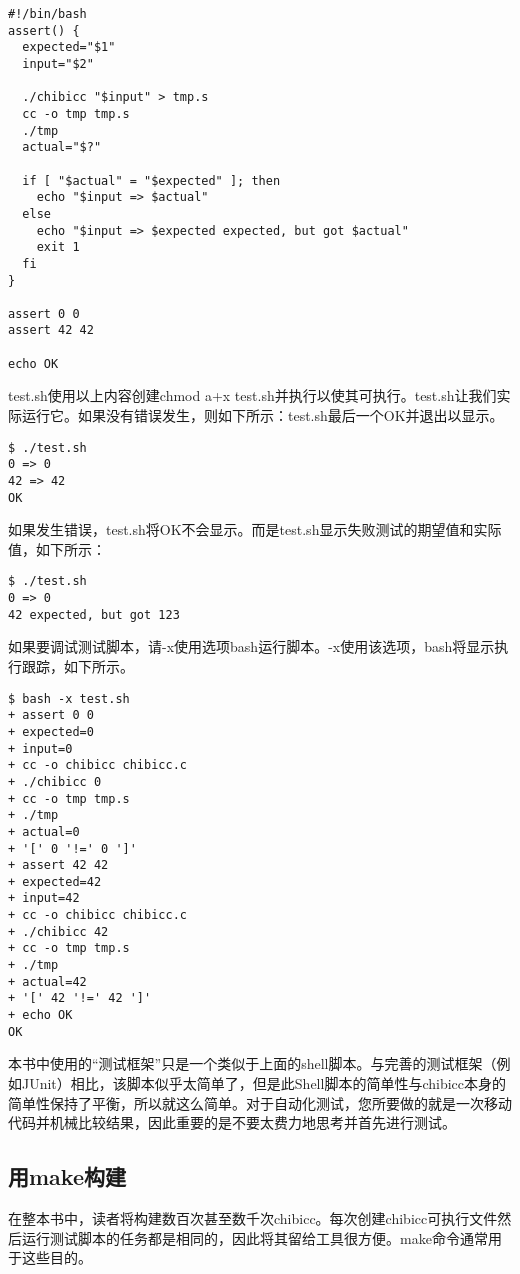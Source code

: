 \documentclass[cn,10pt,math=newtx,citestyle=gb7714-2015,bibstyle=gb7714-2015]{elegantbook}
\begin{document}
\begin{verbatim}
#!/bin/bash
assert() {
  expected="$1"
  input="$2"

  ./chibicc "$input" > tmp.s
  cc -o tmp tmp.s
  ./tmp
  actual="$?"

  if [ "$actual" = "$expected" ]; then
    echo "$input => $actual"
  else
    echo "$input => $expected expected, but got $actual"
    exit 1
  fi
}

assert 0 0
assert 42 42

echo OK
\end{verbatim}

test.sh使用以上内容创建chmod a+x test.sh并执行以使其可执行。test.sh让我们实际运行它。如果没有错误发生，则如下所示：test.sh最后一个OK并退出以显示。

\begin{verbatim}
$ ./test.sh
0 => 0
42 => 42
OK
\end{verbatim}

如果发生错误，test.sh将OK不会显示。而是test.sh显示失败测试的期望值和实际值，如下所示：

\begin{verbatim}
$ ./test.sh
0 => 0
42 expected, but got 123
\end{verbatim}

如果要调试测试脚本，请-x使用选项bash运行脚本。-x使用该选项，bash将显示执行跟踪，如下所示。

\begin{verbatim}
$ bash -x test.sh
+ assert 0 0
+ expected=0
+ input=0
+ cc -o chibicc chibicc.c
+ ./chibicc 0
+ cc -o tmp tmp.s
+ ./tmp
+ actual=0
+ '[' 0 '!=' 0 ']'
+ assert 42 42
+ expected=42
+ input=42
+ cc -o chibicc chibicc.c
+ ./chibicc 42
+ cc -o tmp tmp.s
+ ./tmp
+ actual=42
+ '[' 42 '!=' 42 ']'
+ echo OK
OK
\end{verbatim}

本书中使用的“测试框架”只是一个类似于上面的shell脚本。与完善的测试框架（例如JUnit）相比，该脚本似乎太简单了，但是此Shell脚本的简单性与chibicc本身的简单性保持了平衡，所以就这么简单。对于自动化测试，您所要做的就是一次移动代码并机械比较结果，因此重要的是不要太费力地思考并首先进行测试。

\subsection{用make构建}

在整本书中，读者将构建数百次甚至数千次chibicc。每次创建chibicc可执行文件然后运行测试脚本的任务都是相同的，因此将其留给工具很方便。make命令通常用于这些目的。
\end{document}
